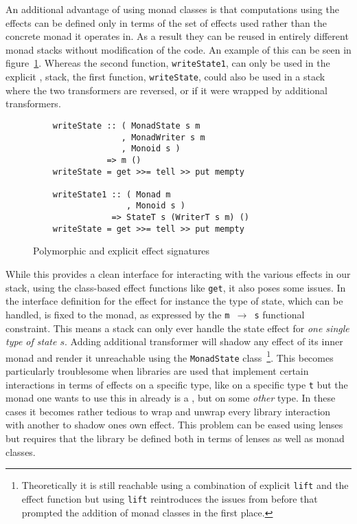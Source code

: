 An additional advantage of using monad classes is that computations using the
effects can be defined only in terms of the set of effects used rather than the
concrete monad it operates in. As a result they can be reused in entirely
different monad stacks without modification of the code. An example of this can
be seen in figure~\ref{fig:monad-class-poly}. Whereas the second function,
\texttt{writeState1}, can only be used in the explicit \StateT{}, \WriterT{}
stack, the first function, \texttt{writeState}, could also be used in a stack
where the two transformers are reversed, or if it were wrapped by additional
transformers.

\begin{figure}
  \begin{lstlisting}
    writeState :: ( MonadState s m
                  , MonadWriter s m
                  , Monoid s )
               => m ()
    writeState = get >>= tell >> put mempty

    writeState1 :: ( Monad m
                   , Monoid s )
                => StateT s (WriterT s m) ()
    writeState = get >>= tell >> put mempty
  \end{lstlisting}
  \caption{Polymorphic and explicit effect signatures}
  \label{fig:monad-class-poly}
\end{figure}

While this provides a clean interface for interacting with the various effects
in our stack, using the class-based effect functions like \texttt{get}, it also
poses some issues. In the interface definition for the \StateM{} effect for
instance the type of state, which can be handled, is fixed to the monad, as
expressed by the \texttt{m $\rightarrow$ s} functional constraint. This means a
stack can only ever handle the state effect for \emph{one single type of state
  $s$}. Adding additional \StateT{} transformer will shadow any \StateM{} effect
of its inner monad and render it unreachable using the \texttt{MonadState}
class~\footnote{Theoretically it is still reachable using a combination of
  explicit \texttt{lift} and the effect function but using \texttt{lift}
  reintroduces the issues from before that prompted the addition of monad
  classes in the first place.}. This becomes particularly troublesome when
libraries are used that implement certain interactions in terms of effects on a
specific type, like \ReaderM{} on a specific type \texttt{t} but the monad one
wants to use this in already is a \ReaderM{}, but on some \emph{other} type. In
these cases it becomes rather tedious to wrap and unwrap every library
interaction with another \ReaderT{} to shadow ones own \ReaderM{} effect. This
problem can be eased using lenses but requires that the library be defined both
in terms of lenses as well as monad classes.

